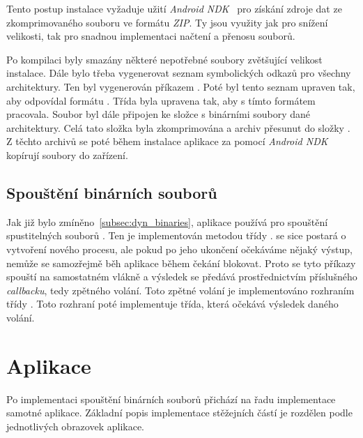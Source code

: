     Tento postup instalace vyžaduje užití \emph{Android NDK}~ pro získání zdroje dat ze zkomprimovaného souboru ve formátu \emph{ZIP}. Ty jsou využity jak pro snížení velikosti, tak pro snadnou implementaci načtení a přenosu souborů.

    Po kompilaci byly smazány některé nepotřebné soubory zvětšující velikost instalace. Dále bylo třeba vygenerovat seznam symbolických odkazů pro všechny architektury. Ten byl vygenerován příkazem . Poté byl tento seznam upraven tak, aby odpovídal formátu . Třída  byla upravena tak, aby s tímto formátem pracovala. Soubor  byl dále připojen ke složce s binárními soubory dané architektury. Celá tato složka byla zkomprimována a archiv přesunut do složky . Z těchto archivů se poté během instalace aplikace za pomocí \emph{Android NDK} kopírují soubory do zařízení.

    \subsection{Spouštění binárních souborů}
    Jak již bylo zmíněno~\ref{subsec:dyn_binaries}, aplikace používá pro spouštění spustitelných souborů . Ten je implementován metodou  třídy .  se sice postará o vytvoření nového procesu, ale pokud po jeho ukončení očekáváme nějaký výstup, nemůže se samozřejmě běh aplikace během čekání blokovat. Proto se tyto příkazy spouští na samostatném vlákně a výsledek se předává prostřednictvím příslušného \emph{callbacku}, tedy zpětného volání. Toto zpětné volání je implementováno rozhraním  třídy . Toto rozhraní poté implementuje třída, která očekává výsledek daného volání.

\section{Aplikace}
Po implementaci spouštění binárních souborů přichází na řadu implementace samotné aplikace. Základní popis implementace stěžejních částí je rozdělen podle jednotlivých obrazovek aplikace.


